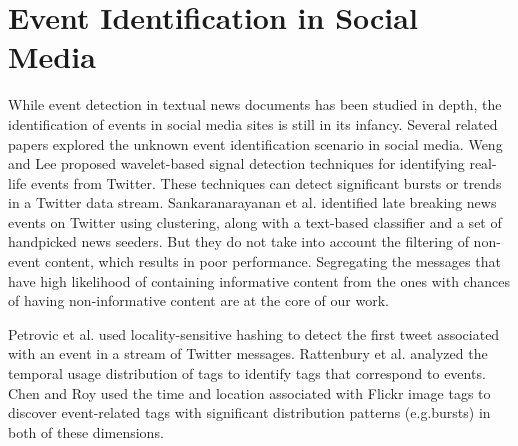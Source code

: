 \section{Event Identification in Social Media}
While event detection in textual news documents has been studied in depth, the identification
of events in social media sites is still in its infancy. Several related papers explored the unknown event identification scenario in social media.
Weng and Lee \cite{weng2011event} proposed wavelet-based signal detection techniques for identifying
real-life events from Twitter. These techniques can detect significant bursts or trends
in a Twitter data stream. Sankaranarayanan et al. \cite{sankaranarayanan2009twitterstand}
identified late breaking news events on Twitter using clustering, along with a text-based
classifier and a set of handpicked news seeders. But they do not take into account the filtering of non-event content, which results in poor performance. Segregating the messages that have high likelihood of containing informative content from the ones with chances of having non-informative content are at the core of our work.  





Petrovic et al. \cite{petrovic2010streaming} used locality-sensitive hashing to detect the first tweet associated with an event in a stream of Twitter messages. Rattenbury et al. \cite{rattenbury2007towards} analyzed the temporal usage distribution of tags to identify tags that correspond
to events. Chen and Roy \cite{chen2009event} used the time and location associated with Flickr image
tags to discover event-related tags with significant distribution patterns (e.g.bursts) in
both of these dimensions.
 
%


